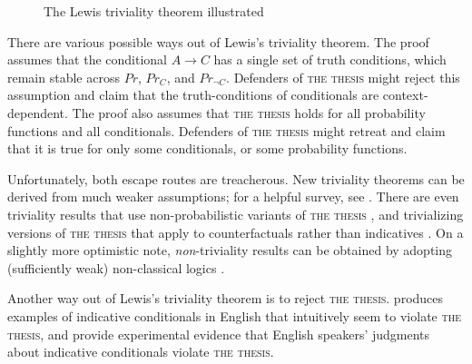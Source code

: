 \begin{figure}
\caption{The Lewis triviality theorem illustrated}
\label{fig-triviality}
\end{figure}

There are various possible ways out of Lewis's triviality theorem.  The proof assumes that the conditional $A \rightarrow C$ has a single set of truth conditions, which remain stable across $Pr$, $Pr_C$, and $Pr_{\neg C}$.  Defenders of \textsc{the thesis} might reject this assumption and claim that the truth-conditions of conditionals are context-dependent.  The proof also assumes that \textsc{the thesis} holds for all probability functions and all conditionals.  Defenders of \textsc{the thesis} might retreat and claim that it is true for only some conditionals, or some probability functions.

Unfortunately, both escape routes are treacherous.  New triviality theorems can be derived from much weaker assumptions; for a helpful survey, see \citet{hall-hajek}.  There are even triviality results that use non-probabilistic variants of \textsc{the thesis} \citep{gardenfors-knowledge}, and trivializing versions of \textsc{the thesis} that apply to counterfactuals rather than indicatives \citep{williams-counterfactual-triviality}. On a slightly more optimistic note, \emph{non}-triviality results can be obtained by adopting (sufficiently weak) non-classical logics \citep{morgan-mares-nontrivial}.

Another way out of Lewis's triviality theorem is to reject \textsc{the thesis}.  \citet{kaufmann-grain} produces examples of indicative conditionals in English that intuitively seem to violate \textsc{the thesis}, and \citet{douven-verbrugge} provide experimental evidence that English speakers' judgments about indicative conditionals violate \textsc{the thesis}.

